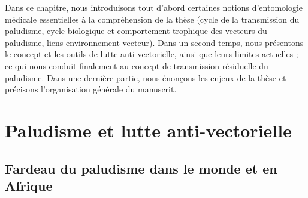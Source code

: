 \documentclass[12pt,twoside]{reedthesis}
\begin{document}
Dans ce chapitre, nous introduisons tout d'abord certaines notions d'entomologie médicale essentielles à la compréhension de la thèse (cycle de la transmission du paludisme, cycle biologique et comportement trophique des vecteurs du paludisme, liens environnement-vecteur). Dans un second temps, nous présentons le concept et les outils de lutte anti-vectorielle, ainsi que leurs limites actuelles ; ce qui nous conduit finalement au concept de transmission résiduelle du paludisme. Dans une dernière partie, nous énonçons les enjeux de la thèse et précisons l'organisation générale du manuscrit.

\hypertarget{paludisme-et-lutte-anti-vectorielle}{%
\section{Paludisme et lutte anti-vectorielle}\label{paludisme-et-lutte-anti-vectorielle}}

\hypertarget{fardeau-du-paludisme-dans-le-monde-et-en-afrique}{%
\subsection{Fardeau du paludisme dans le monde et en Afrique}\label{fardeau-du-paludisme-dans-le-monde-et-en-afrique}}
\end{document}
